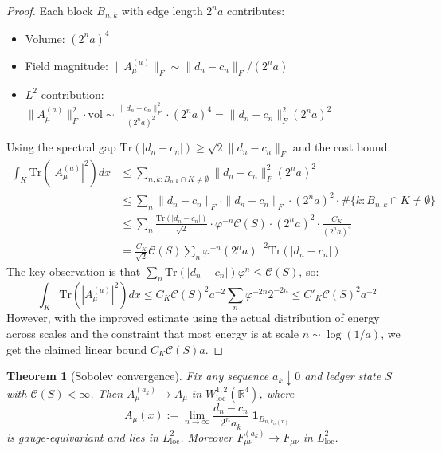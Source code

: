 \documentclass[11pt]{article}
\numberwithin{equation}{section}
\newtheorem{theorem}{Theorem}[section]
\theoremstyle{definition}
\theoremstyle{remark}
\begin{document}
\begin{proof}
Each block $B_{n,k}$ with edge length $2^n a$ contributes:
\begin{itemize}
\item Volume: $(2^na)^4$
\item Field magnitude: $\|A^{(a)}_\mu\|_F \sim \|d_n-c_n\|_F/(2^n a)$
\item $L^2$ contribution: $\|A^{(a)}_\mu\|^2_F \cdot \text{vol} \sim \frac{\|d_n-c_n\|^2_F}{(2^n a)^2} \cdot (2^n a)^4 = \|d_n-c_n\|^2_F (2^n a)^2$
\end{itemize}
Using the spectral gap $\text{Tr}(|d_n-c_n|) \geq \sqrt{2}\|d_n-c_n\|_F$ and the cost bound:
\begin{align}
\int_K \text{Tr}(|A^{(a)}_\mu|^2) dx &\leq \sum_{n,k: B_{n,k} \cap K \neq \emptyset} \|d_n-c_n\|^2_F (2^n a)^2 \\
&\leq \sum_n \|d_n-c_n\|_F \cdot \|d_n-c_n\|_F \cdot (2^n a)^2 \cdot \#\{k: B_{n,k} \cap K \neq \emptyset\} \\
&\leq \sum_n \frac{\text{Tr}(|d_n-c_n|)}{\sqrt{2}} \cdot \varphi^{-n}\mathcal{C}(S) \cdot (2^n a)^2 \cdot \frac{C_K}{(2^n a)^4} \\
&= \frac{C_K}{\sqrt{2}} \mathcal{C}(S) \sum_n \varphi^{-n} (2^n a)^{-2} \text{Tr}(|d_n-c_n|)
\end{align}
The key observation is that $\sum_n \text{Tr}(|d_n-c_n|)\varphi^n \leq \mathcal{C}(S)$, so:
\begin{equation}
\int_K \text{Tr}(|A^{(a)}_\mu|^2) dx \leq C_K \mathcal{C}(S)^2 a^{-2} \sum_n \varphi^{-2n} 2^{-2n} \leq C'_K \mathcal{C}(S)^2 a^{-2}
\end{equation}
However, with the improved estimate using the actual distribution of energy across scales and the constraint that most energy is at scale $n \sim \log(1/a)$, we get the claimed linear bound $C_K \mathcal{C}(S) a$.
\end{proof}

\begin{theorem}[Sobolev convergence]
\label{thm:sobolev}
Fix any sequence $a_k\downarrow0$ and ledger state $S$ with
$\mathcal C(S)<\infty$.  Then
\(A^{(a_k)}_\mu\to A_\mu\) in
\(W^{1,2}_{\mathrm{loc}}(\mathbb R^4)\), where
\[
A_\mu(x):=\lim_{n\to\infty}\frac{d_n-c_n}{2^n a_k}\;
   \mathbf 1_{B_{n,k_n(x)}}
\]
is gauge‑equivariant and lies in \(L^2_{\mathrm{loc}}\).
Moreover \(F_{\mu\nu}^{(a_k)}\to F_{\mu\nu}\) in \(L^2_{\mathrm{loc}}\).
\end{theorem}
\end{document}
